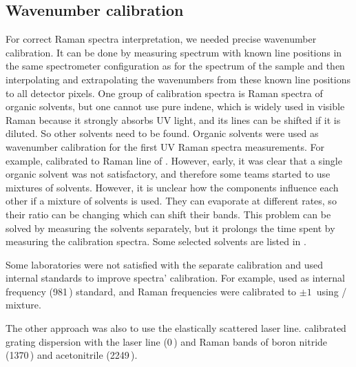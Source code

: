 \subsection{Wavenumber calibration}
\label{wavenumber_calibration}

For correct Raman spectra interpretation, we needed precise wavenumber
calibration.
It can be done by measuring spectrum with known line positions in the same
spectrometer configuration as for the spectrum of the sample and then
interpolating and extrapolating the wavenumbers from these known line positions
to all detector pixels.
One group of calibration spectra is Raman spectra of organic solvents, but one
cannot use pure indene, which is widely used in visible Raman because it
strongly absorbs UV light, and its lines can be shifted if it is diluted.
So other solvents need to be found.
Organic solvents were used as wavenumber calibration for the first UV Raman
spectra measurements.
For example, \textcite{Harada1975} calibrated to Raman line of .
However, early, it was clear that a single organic solvent was not
satisfactory, and therefore some teams started to use mixtures of solvents.
However, it is unclear how the components influence each other if a mixture of
solvents is used.
They can evaporate at different rates, so their ratio can be changing which can
shift their bands.
This problem can be solved by measuring the solvents separately, but it
prolongs the time spent by measuring the calibration spectra.
Some selected solvents are listed in
.

\begin{table}
	\centering
	
	\caption[%
		Selection of organic solvents which were used for UV Raman spectra
		wavenumber calibration in literature.%
	]{%
	}
	\label{\tablabel{wavenumber_calibration:solvents}}
\end{table}

Some laboratories were not satisfied with the separate calibration and used
internal standards to improve spectra' calibration.
For example,
\textcite{Wen1998}
used  as internal frequency (981\,\icm) standard, and Raman
frequencies were calibrated to $\pm1 $\,\icm{} using /
mixture.

The other approach was also to use the elastically scattered laser line.
\textcite{Kumamoto2012}
calibrated grating dispersion with the laser line (0\,\icm) and Raman bands of
boron nitride (1370\,\icm) and acetonitrile (2249\,\icm).

